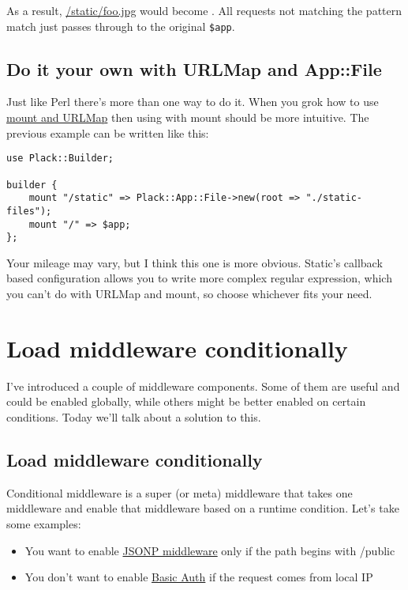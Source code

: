 As a result, \url{/static/foo.jpg} would become
. All requests not matching the pattern match
just passes through to the original \lstinline!$app!.

\section{Do it your own with URLMap and
App::File}\label{do-it-your-own-with-urlmap-and-appfile}

Just like Perl there's more than one way to do it. When you grok how to
use
\href{http://advent.plackperl.org/2009/12/day-12-maps-multiple-apps-with-mount-and-urlmap.html}{mount
and URLMap} then using  with mount should be more intuitive.
The previous example can be written like this:

\begin{lstlisting}
use Plack::Builder;

builder {
    mount "/static" => Plack::App::File->new(root => "./static-files");
    mount "/" => $app;
};
\end{lstlisting}

Your mileage may vary, but I think this one is more obvious. Static's
callback based configuration allows you to write more complex regular
expression, which you can't do with URLMap and mount, so choose
whichever fits your need.

\chapter{Load middleware
conditionally}\label{day-18-load-middleware-conditionally}

I've introduced a couple of middleware components. Some of them are
useful and could be enabled globally, while others might be better
enabled on certain conditions. Today we'll talk about a solution to
this.

\section{Load middleware
conditionally}\label{load-middleware-conditionally}

Conditional middleware is a super (or meta) middleware that takes one
middleware and enable that middleware based on a runtime condition.
Let's take some examples:

\begin{itemize}
\itemsep1pt\parskip0pt
\item
  You want to enable
  \href{http://advent.plackperl.org/2009/12/day-16-adding-jsonp-support-to-your-app.html}{JSONP
  middleware} only if the path begins with /public
\item
  You don't want to enable
  \href{http://advent.plackperl.org/2009/12/day-15-authenticate-your-app-with-middleware.html}{Basic
  Auth} if the request comes from local IP
\end{itemize}

